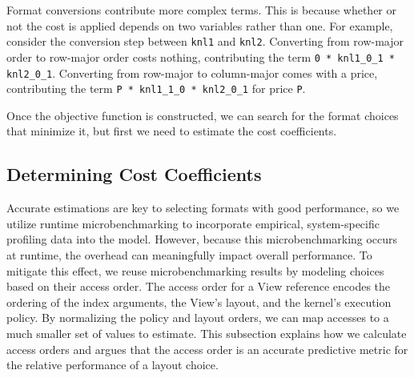 \documentclass[sigconf,review=true]{acmart}
\begin{document}
Format conversions contribute more complex terms.
This is because whether or not the cost is applied depends on two variables rather than one. 
For example, consider the conversion step between \verb.knl1. and \verb.knl2.. 
Converting from row-major order to row-major order costs nothing, contributing the term \verb.0 * knl1_0_1 * knl2_0_1..
Converting from row-major to column-major comes with a price, contributing the term \verb.P * knl1_1_0 * knl2_0_1. for price \verb.P..

Once the objective function is constructed, we can search for the format choices that minimize it, but first we need to estimate the cost coefficients.

\subsection{Determining Cost Coefficients}
Accurate estimations are key to selecting formats with good performance, so we utilize runtime microbenchmarking to incorporate empirical, system-specific profiling data into the model.
However, because this microbenchmarking occurs at runtime, the overhead can meaningfully impact overall performance. 
To mitigate this effect, we reuse microbenchmarking results by modeling choices based on their access order.
The access order for a View reference encodes the ordering of the index arguments, the View's layout, and the kernel's execution policy.
By normalizing the policy and layout orders, we can map accesses to a much smaller set of values to estimate.
This subsection explains how we calculate access orders and argues that the access order is an accurate predictive metric for the relative performance of a layout choice. 
\end{document}
